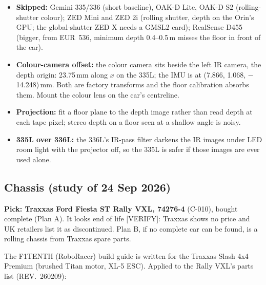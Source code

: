 \documentclass[11pt,a4paper]{article}
\begin{document}
\begin{itemize}
  \item \textbf{Skipped:} Gemini 335/336 (short baseline), OAK-D Lite, OAK-D S2 (rolling-shutter colour); ZED Mini and ZED 2i (rolling shutter, depth on the Orin's GPU; the global-shutter ZED X needs a GMSL2 card); RealSense D455 (bigger, from EUR~536, minimum depth 0.4--0.5\,m misses the floor in front of the car).
  \item \textbf{Colour-camera offset:} the colour camera sits beside the left IR camera, the depth origin: 23.75\,mm along $x$ on the 335L; the IMU is at (7.866, 1.068, $-$14.248)\,mm. Both are factory transforms and the floor calibration absorbs them. Mount the colour lens on the car's centreline.
  \item \textbf{Projection:} fit a floor plane to the depth image rather than read depth at each tape pixel; stereo depth on a floor seen at a shallow angle is noisy.
  \item \textbf{335L over 336L:} the 336L's IR-pass filter darkens the IR images under LED room light with the projector off, so the 335L is safer if those images are ever used alone.
\end{itemize}

\subsection{Chassis (study of 24 Sep 2026)}\label{sec:chassis}
\begin{takeaway}
\textbf{Pick: Traxxas Ford Fiesta ST Rally VXL, 74276-4} (C-010), bought complete (Plan A). It looks end of life [VERIFY]: Traxxas shows no price and UK retailers list it as discontinued. Plan B, if no complete car can be found, is a rolling chassis from Traxxas spare parts.
\end{takeaway}

The F1TENTH (RoboRacer) build guide is written for the Traxxas Slash 4x4 Premium (brushed Titan motor, XL-5 ESC). Applied to the Rally VXL's parts list (REV.\ 260209):
\end{document}

